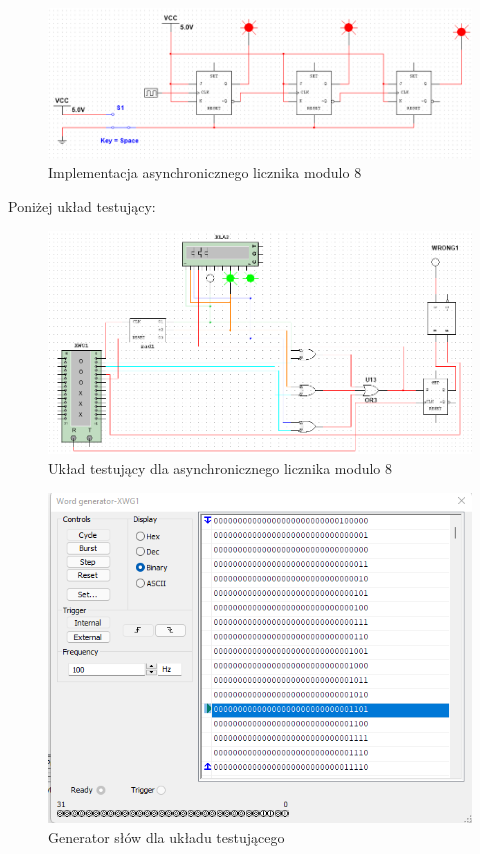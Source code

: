 \documentclass{article}
\begin{document}
\begin{figure}[H]
    \centering
    \includegraphics[width=\textwidth]{3a_modulo8.png}
    \caption{Implementacja asynchronicznego licznika modulo 8}
\end{figure}

\pagebreak
Poniżej układ testujący:

\begin{figure}[H]
    \centering
    \includegraphics[width=\textwidth]{3a_modulo8_test.png}
    \caption{Układ testujący dla asynchronicznego licznika modulo 8}
\end{figure}

\begin{figure}[H]
    \centering
    \includegraphics[width=\textwidth]{3a_modulo8_gen.png}
    \caption{Generator słów dla układu testującego}
\end{figure}
\end{document}
